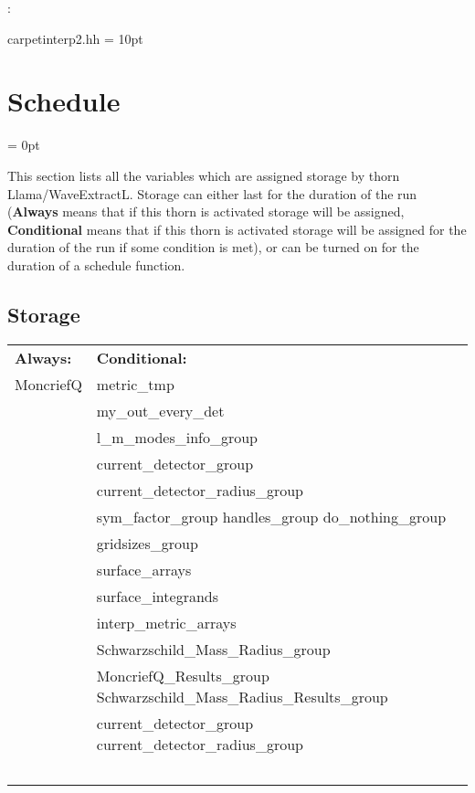 \documentclass{article}
\begin{document}
\vspace{5mm}

: 

carpetinterp2.hh
\vspace{2mm}\parskip = 10pt 

\section{Schedule} 


\parskip = 0pt


\noindent This section lists all the variables which are assigned storage by thorn Llama/WaveExtractL.  Storage can either last for the duration of the run ({\bf Always} means that if this thorn is activated storage will be assigned, {\bf Conditional} means that if this thorn is activated storage will be assigned for the duration of the run if some condition is met), or can be turned on for the duration of a schedule function.


\subsection*{Storage}

\hspace{5mm}

 \begin{tabular*}{160mm}{ll} 

{\bf Always:}& {\bf Conditional:} \\ 
 MoncriefQ &  metric\_tmp\\ 
~ &  my\_out\_every\_det\\ 
~ &  l\_m\_modes\_info\_group\\ 
~ &  current\_detector\_group\\ 
~ &  current\_detector\_radius\_group\\ 
~ &  sym\_factor\_group handles\_group do\_nothing\_group\\ 
~ &  gridsizes\_group\\ 
~ &  surface\_arrays\\ 
~ &  surface\_integrands\\ 
~ &  interp\_metric\_arrays\\ 
~ &  Schwarzschild\_Mass\_Radius\_group\\ 
~ &  MoncriefQ\_Results\_group Schwarzschild\_Mass\_Radius\_Results\_group\\ 
~ &  current\_detector\_group current\_detector\_radius\_group\\ 
~ & ~\\ 
\end{tabular*} 
\end{document}
